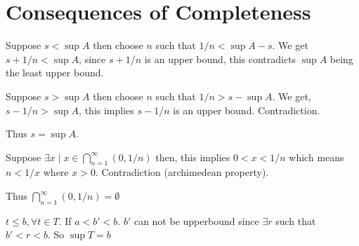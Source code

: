 \section{Consequences of Completeness}

\begin{solution}
\end{solution}


\begin{solution}
  Suppose $s < \sup A$ then choose $n$ such that $1/n < \sup A - s$.
  We get $s + 1/n < \sup A$, since $s + 1/n$ is an upper bound, this contradicts $\sup A$ being the least upper bound.

  Suppose $s > \sup A$ then choose $n$ such that $1/n  > s - \sup A$.
  We get, $s - 1/n > \sup A$, this implies $s - 1/n$ is an upper bound. Contradiction.

  Thus $s = \sup A$.
\end{solution}

\begin{solution}
  Suppose $\exists x \mid x \in \bigcap_{n = 1}^{\infty} (0, 1/n)$ then,
  this implies $0 < x < 1/n$ which means $n < 1/x$ where $x > 0$. Contradiction (archimedean property).

  Thus $\bigcap_{n = 1}^{\infty} (0, 1/n) = \emptyset$
\end{solution}

\begin{solution}
  $t \leq b, \forall t \in T$.
  If $a < b' < b$. $b'$ can not be upperbound since $\exists r$ such that $b' < r < b$.
  So $\sup T = b$
\end{solution}

